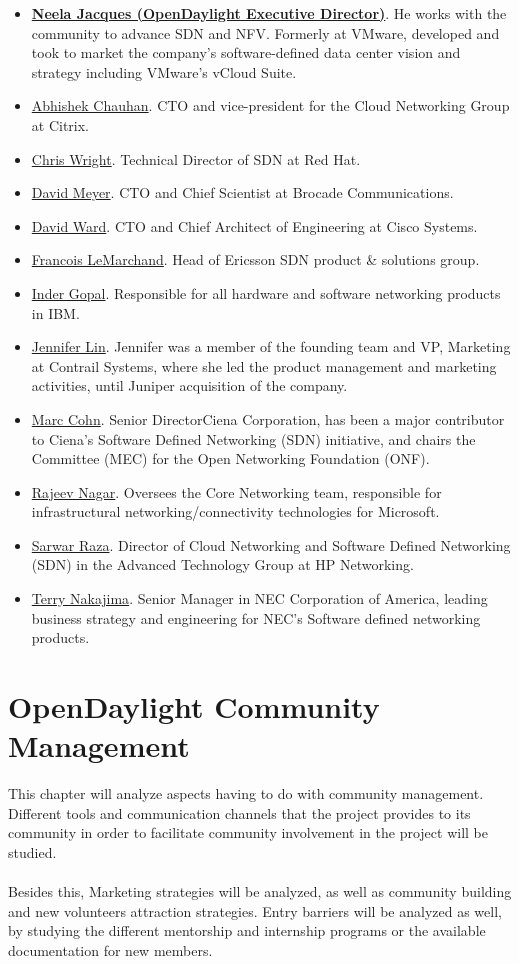 \documentclass[a4paper, 12pt]{book}
\begin{document}
\begin{itemize}\itemsep0pt
\item{\underline{\textbf{Neela Jacques (OpenDaylight Executive Director)}}}. He works with the community to advance SDN and NFV. Formerly at VMware, developed and took to market the company’s software-defined data center vision and strategy including VMware’s vCloud Suite.
\item{\underline{Abhishek Chauhan}}. CTO and vice-president for the Cloud Networking Group at Citrix.
\item{\underline{Chris Wright}}. Technical Director of SDN at Red Hat.
\item{\underline{David Meyer}}. CTO and Chief Scientist at Brocade Communications.
\item{\underline{David Ward}}. CTO and Chief Architect of Engineering at Cisco Systems.
\item{\underline{Francois LeMarchand}}. Head of Ericsson SDN product \& solutions group.
\item{\underline{Inder Gopal}}. Responsible for all hardware and software networking products in IBM.
\item{\underline{Jennifer Lin}}. Jennifer was a member of the founding team and VP, Marketing at Contrail Systems, where she led the product management and marketing activities, until Juniper acquisition of the company.
\item{\underline{Marc Cohn}}. Senior DirectorCiena Corporation, has been a major contributor to Ciena’s Software Defined Networking (SDN) initiative, and chairs the Committee (MEC) for the Open Networking Foundation (ONF).
\item{\underline{Rajeev Nagar}}. Oversees the Core Networking team, responsible for infrastructural networking/connectivity technologies for Microsoft.
\item{\underline{Sarwar Raza}}. Director of Cloud Networking and Software Defined Networking (SDN) in the Advanced Technology Group at HP Networking.
\item{\underline{Terry Nakajima}}. Senior Manager in NEC Corporation of America, leading business strategy and engineering for NEC’s Software defined networking products.
\end{itemize}

\section{OpenDaylight Community Management}
\label{chap:odlcommunitymgmt}
This chapter will analyze aspects having to do with community management. Different tools and communication channels that the project provides to its community in order to facilitate community involvement in the project will be studied.\\
\\
Besides this, Marketing strategies will be analyzed, as well as community building and new volunteers attraction strategies. Entry barriers will be analyzed as well, by studying the different mentorship and internship programs or the available documentation for new members.
\end{document}

